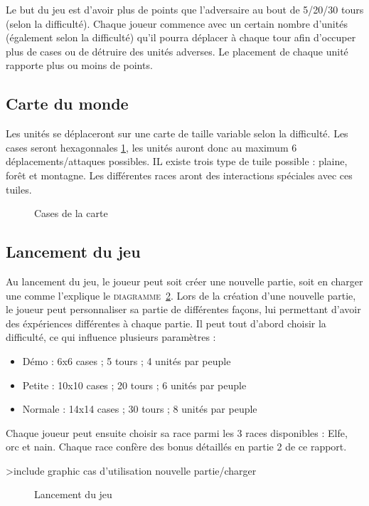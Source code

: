 Le but du jeu est d'avoir plus de points que l'adversaire au bout de 5/20/30 tours (selon la difficulté). Chaque joueur commence avec un certain nombre d'unités (également selon la difficulté) qu'il pourra déplacer à chaque tour afin d'occuper plus de cases ou de détruire des unités adverses. Le placement de chaque unité rapporte plus ou moins de points.

\subsection{Carte du monde}

Les unités se déplaceront sur une carte de taille variable selon la difficulté. Les cases seront hexagonnales \ref{cases}, les unités auront donc au maximum 6 déplacements/attaques possibles. IL existe trois type de tuile possible : plaine, forêt et montagne. Les différentes races aront des interactions spéciales avec ces tuiles.

\begin{figure}[!h]
\centering
\label{cases}
\caption{Cases de la carte}
\end{figure}

\subsection{Lancement du jeu}

Au lancement du jeu, le joueur peut soit créer une nouvelle partie, soit en charger une comme l'explique le \textsc{diagramme~\ref{lancement}}. Lors de la création d'une nouvelle partie, le joueur peut personnaliser sa partie de différentes façons, lui permettant d'avoir des éxpériences différentes à chaque partie. Il peut tout d'abord choisir la difficulté, ce qui influence plusieurs paramètres :

\begin{itemize}
  \item Démo    :   6x6 cases ;  5 tours ; 4 unités par peuple
  \item Petite  : 10x10 cases ; 20 tours ; 6 unités par peuple
  \item Normale : 14x14 cases ; 30 tours ; 8 unités par peuple
\end{itemize}

Chaque joueur peut ensuite choisir sa race parmi les 3 races disponibles : Elfe, orc et nain. Chaque race confère des bonus détaillés en partie 2 de ce rapport.

>include graphic cas d'utilisation nouvelle partie/charger
\begin{figure}[!h]
\centering
\label{lancement}
\caption{Lancement du jeu}
\end{figure}

